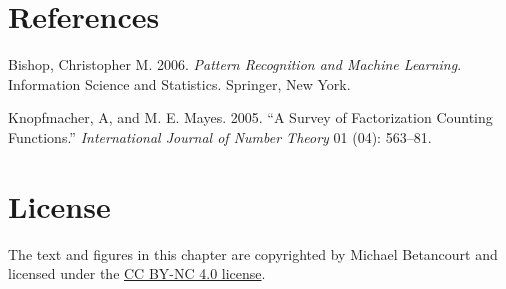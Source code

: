 \documentclass[
  letterpaper,
  DIV=11,
  numbers=noendperiod]{scrartcl}
\newlength{\cslhangindent}
\newenvironment{CSLReferences}[2] %
 {\begin{list}{}{%
  \setlength{\itemindent}{0pt}
  \setlength{\leftmargin}{0pt}
  \setlength{\parsep}{0pt}
  \ifodd #1
   \setlength{\leftmargin}{\cslhangindent}
   \setlength{\itemindent}{-1\cslhangindent}
  \fi
  \setlength{\itemsep}{#2\baselineskip}}}
 {\end{list}}
\begin{document}
\section*{References}\label{references}

\label{refs}
\begin{CSLReferences}{1}{0}
Bishop, Christopher M. 2006. \emph{Pattern Recognition and Machine
Learning}. Information Science and Statistics. Springer, New York.

Knopfmacher, A, and M. E. Mayes. 2005. {``A Survey of Factorization
Counting Functions.''} \emph{International Journal of Number Theory} 01
(04): 563--81.

\end{CSLReferences}

\section*{License}\label{license}

The text and figures in this chapter are copyrighted by Michael
Betancourt and licensed under the
\href{https://creativecommons.org/licenses/by-nc/4.0/}{CC BY-NC 4.0
license}.
\end{document}
